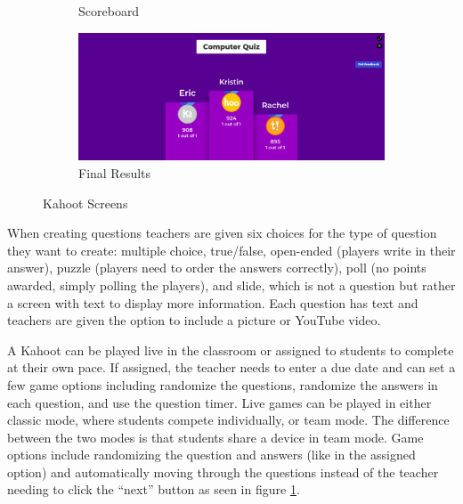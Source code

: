 \documentclass{article}
\begin{document}
\begin{figure}[ht]
\begin{subfigure}[b]{0.49\textwidth}
                \caption{Scoreboard}
                \label{fig:kahoot-scoreboard}
            \end{subfigure}
            \begin{subfigure}[b]{0.49\textwidth}
                \includegraphics[width=\textwidth]{images/kahoot-finished.png}
                \caption{Final Results}
                \label{fig:kahoot-final}
            \end{subfigure}
            \caption{Kahoot Screens \cite{kahoot}}\label{fig:kahoot}
        \end{figure}
        
        When creating questions teachers are given six choices for the type of question they want to create: multiple choice, true/false, open-ended (players write in their answer), puzzle (players need to order the answers correctly), poll (no points awarded, simply polling the players), and slide, which is not a question but rather a screen with text to display more information. Each question has text and teachers are given the option to include a picture or YouTube video.
        \smallskip
        
        A Kahoot can be played live in the classroom or assigned to students to complete at their own pace. If assigned, the teacher needs to enter a due date and can set a few game options including randomize the questions, randomize the answers in each question, and use the question timer. Live games can be played in either classic mode, where students compete individually, or team mode. The difference between the two modes is that students share a device in team mode. Game options include randomizing the question and answers (like in the assigned option) and automatically moving through the questions instead of the teacher needing to click the ``next'' button as seen in figure \ref{fig:kahoot-scoreboard}.
    
\end{document}
